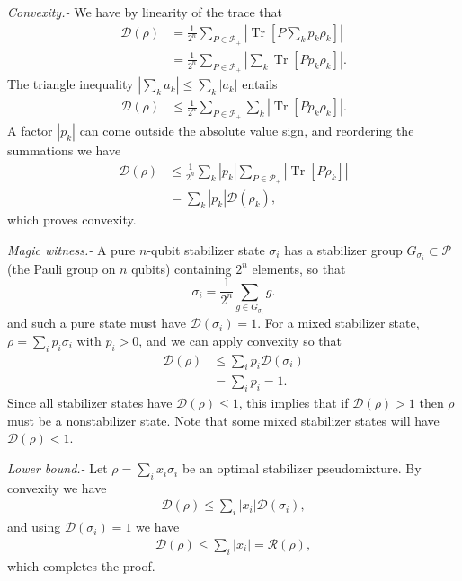 \documentclass[aps,prl,twocolumn,showpacs,superscriptaddress,groupedaddress,amsmath,amssymb]{revtex4-1}  %
\DeclareMathOperator{\Tr}{Tr}
\newcommand{\Pplus}{\ensuremath{\mathcal{P}_{+}}}
\newcommand{\tr}{\ensuremath{\mathrm{\Tr}}}
\begin{document}
\noindent\textit{Convexity.-}  We have by linearity of the trace that
\begin{align}
	\mathcal{D}(\rho)  &= \frac{1}{2^n} \sum_{P \in \Pplus} | \tr[ P \sum_k p_k \rho_k ]| 	\\ \nonumber
&=\frac{1}{2^n}   \sum_{P \in \Pplus} |  \sum_k  \tr[ P p_k \rho_k ]|.
\end{align}
The triangle inequality $|\sum_k a_k|\leq \sum_k |a_k|$ entails
\begin{align}
	\mathcal{D}(\rho)  &\leq  \frac{1}{2^n} \sum_{P \in \Pplus} \sum_k | \tr[ P p_k \rho_k ]|.
\end{align}
A factor $|p_k|$ can come outside the absolute value sign, and reordering the summations we have
\begin{align}
	\mathcal{D}(\rho)  &\leq \frac{1}{2^n} \sum_k | p_k |  \sum_{P \in \Pplus}  | \tr[ P \rho_k ]|  \\ \nonumber
& = \sum_k |p_k| \mathcal{D}(\rho_k) ,
\end{align}
which proves convexity.  

\noindent\textit{Magic witness.-} A pure $n$-qubit stabilizer state $\sigma_i$ has a stabilizer group $G_{\sigma_i} \subset \mathcal{P}$ (the Pauli group on $n$ qubits) containing $2^n$ elements, so that
\begin{equation}
	\sigma_i = \frac{1}{2^n} \sum_{g \in G_{\sigma_i} }	g.
\end{equation}
and such a pure state must have $\mathcal{D}(\sigma_i)=1$.  For a mixed stabilizer state, $\rho  =\sum_i p_i \sigma_i$ with $p_i>0$, and we can apply convexity so that
\begin{align}
		\mathcal{D}(\rho)  & \leq  \sum_i p_i \mathcal{D}(\sigma_i) \\ \nonumber
		 & = \sum_i p_i = 1 .
\end{align}
Since all stabilizer states have $\mathcal{D}(\rho) \leq 1$, this implies that if $\mathcal{D}(\rho)>1$ then $\rho$ must be a nonstabilizer state.  Note that some mixed stabilizer states will have $\mathcal{D}(\rho) < 1$.

\noindent\textit{Lower bound.-} Let $\rho = \sum_i x_i \sigma_i$ be an optimal stabilizer pseudomixture.  By convexity we have
\begin{align}
	\mathcal{D}(\rho) \leq \sum_i|x_i| \mathcal{D}(\sigma_i),
\end{align}
and using $\mathcal{D}(\sigma_i)=1$ we have
\begin{align}
	\mathcal{D}(\rho) \leq \sum_i|x_i|  = \mathcal{R}(\rho),
\end{align}
which completes the proof.
\end{document}
